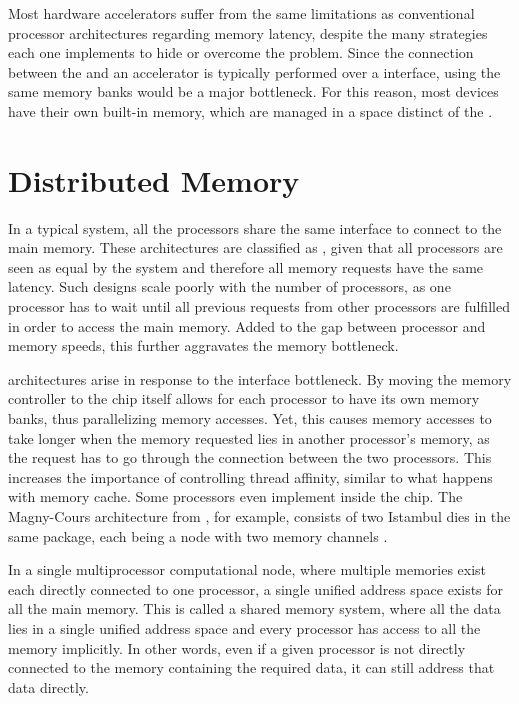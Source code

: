 \documentclass[../thesis]{subfiles}
\begin{document}
		Most hardware accelerators suffer from the same limitations as conventional processor architectures regarding memory latency, despite the many strategies each one implements to hide or overcome the problem. Since the connection between the \cpu and an accelerator is typically performed over a \pcie interface, using the same memory banks would be a major bottleneck. For this reason, most devices have their own built-in memory, which are managed in a space distinct of the \cpu.


		\section{Distributed Memory}
		In a typical \smp system, all the processors share the same interface to connect to the main memory. These architectures are classified as \uma, given that all processors are seen as equal by the system and therefore all memory requests have the same latency. Such designs scale poorly with the number of processors, as one processor has to wait until all previous requests from other processors are fulfilled in order to access the main memory. Added to the gap between processor and memory speeds, this further aggravates the memory bottleneck.

		\numa architectures arise in response to the interface bottleneck. By moving the memory controller to the \cpu chip itself allows for each processor to have its own memory banks, thus parallelizing memory accesses. Yet, this causes memory accesses to take longer when the memory requested lies in another processor's memory, as the request has to go through the connection between the two processors. This increases the importance of controlling thread affinity, similar to what happens with memory cache. Some processors even implement \numa inside the chip. The Magny-Cours architecture from \amd, for example, consists of two Istambul dies in the same package, each being a \numa node with two memory channels \cite{AMD:MagnyCours}.

		In a single multiprocessor computational node, where multiple memories exist each directly connected to one processor, a single unified address space exists for all the main memory. This is called a shared memory system, where all the data lies in a single unified address space and every processor has access to all the memory implicitly. In other words, even if a given processor is not directly connected to the memory containing the required data, it can still address that data directly.
\end{document}
